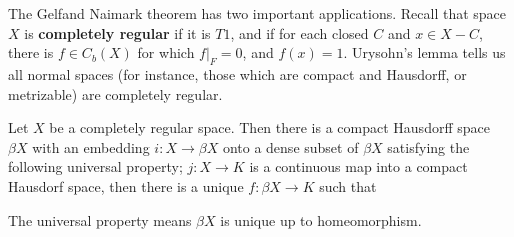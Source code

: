 The Gelfand Naimark theorem has two important applications. Recall that space $X$ is {\bf completely regular} if it is $T1$, and if for each closed $C$ and $x \in X - C$, there is $f \in C_b(X)$ for which $f|_F = 0$, and $f(x) = 1$. Urysohn's lemma tells us all normal spaces (for instance, those which are compact and Hausdorff, or metrizable) are completely regular.

\begin{theorem}
    Let $X$ be a completely regular space. Then there is a compact Hausdorff space $\beta X$ with an embedding $i: X \to \beta X$ onto a dense subset of $\beta X$ satisfying the following universal property; $j: X \to K$ is a continuous map into a compact Hausdorf space, then there is a unique $f: \beta X \to K$ such that
    \begin{center}
    \end{center}
    The universal property means $\beta X$ is unique up to homeomorphism.
\end{theorem}
